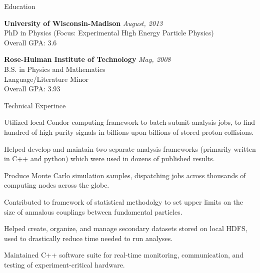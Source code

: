 \documentclass{resume} %
\begin{document}






\begin{rSection}{Education}

{\bf University of Wisconsin-Madison} \hfill {\em August, 2013} \\ 
\/PhD in Physics (Focus: Experimental High Energy Particle Physics) \\
Overall GPA: 3.6

{\bf Rose-Hulman Institute of Technology} \hfill {\em May, 2008} \\
B.S. in Physics and Mathematics\\
Language/Literature Minor\\
Overall GPA: 3.93
\end{rSection}


\begin{rSection}{Technical Experince}

Utilized local Condor computing framework to batch-submit analysis jobs, to find
hundred of high-purity signals in billions upon billions of stored proton
collisions.

Helped develop and maintain two separate analysis frameworks (primarily written
in C++ and python) which were used in dozens of published results.

Produce Monte Carlo simulation samples, dispatching jobs across thousands of
computing nodes across the globe.

Contributed to framework of statistical methodolgy to set upper limits on the
size of anmalous couplings between fundamental particles.

Helped create, organize, and manage secondary datasets stored on local HDFS,
used to drastically reduce time needed to run analyses.

Maintained C++ software suite for real-time monitoring, communication, and
testing of experiment-critical hardware.

\end{rSection}
\end{document}
